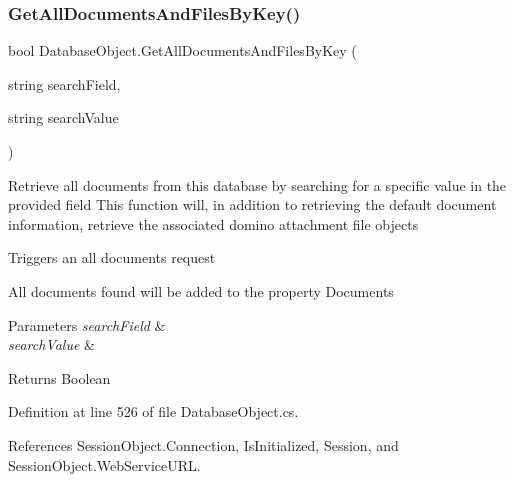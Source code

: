 \subsubsection{\texorpdfstring{Get\+All\+Documents\+And\+Files\+By\+Key()}{GetAllDocumentsAndFilesByKey()}}
{\footnotesize\ttfamily bool Database\+Object.\+Get\+All\+Documents\+And\+Files\+By\+Key (\begin{DoxyParamCaption}\item[{string}]{search\+Field,  }\item[{string}]{search\+Value }\end{DoxyParamCaption})}



Retrieve all documents from this database by searching for a specific value in the provided field This function will, in addition to retrieving the default document information, retrieve the associated domino attachment file objects 

Triggers an all documents request

All documents found will be added to the property \textquotesingle{}Documents\textquotesingle{}


\begin{DoxyParams}{Parameters}
{\em search\+Field} & \\
\hline
{\em search\+Value} & \\
\hline
\end{DoxyParams}
\begin{DoxyReturn}{Returns}
Boolean
\end{DoxyReturn}


Definition at line 526 of file Database\+Object.\+cs.



References Session\+Object.\+Connection, Is\+Initialized, Session, and Session\+Object.\+Web\+Service\+U\+RL.


